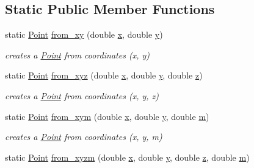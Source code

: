 \subsection*{Static Public Member Functions}
\begin{DoxyCompactItemize}
\item 
static \hyperlink{classsimo_1_1shapes_1_1_point}{Point} \hyperlink{classsimo_1_1shapes_1_1_point_a5babfdb4e450381fce0bd355c060d3cf}{from\-\_\-xy} (double \hyperlink{classsimo_1_1shapes_1_1_point_aa4abc96b03859b69bb1af19099a9799f}{x}, double \hyperlink{classsimo_1_1shapes_1_1_point_a370ca8d7d03517735a9792cca7cbb05e}{y})
\begin{DoxyCompactList}\small\item\em creates a \hyperlink{classsimo_1_1shapes_1_1_point}{Point} from coordinates (x, y) \end{DoxyCompactList}\item 
static \hyperlink{classsimo_1_1shapes_1_1_point}{Point} \hyperlink{classsimo_1_1shapes_1_1_point_af2fe59e7e25d3ab1019fbf9a3365fa30}{from\-\_\-xyz} (double \hyperlink{classsimo_1_1shapes_1_1_point_aa4abc96b03859b69bb1af19099a9799f}{x}, double \hyperlink{classsimo_1_1shapes_1_1_point_a370ca8d7d03517735a9792cca7cbb05e}{y}, double \hyperlink{classsimo_1_1shapes_1_1_point_a4498c1e84bb25e32cd75d41a74d48169}{z})
\begin{DoxyCompactList}\small\item\em creates a \hyperlink{classsimo_1_1shapes_1_1_point}{Point} from coordinates (x, y, z) \end{DoxyCompactList}\item 
static \hyperlink{classsimo_1_1shapes_1_1_point}{Point} \hyperlink{classsimo_1_1shapes_1_1_point_a73475fb5d47c0c77506d8c83c0287f57}{from\-\_\-xym} (double \hyperlink{classsimo_1_1shapes_1_1_point_aa4abc96b03859b69bb1af19099a9799f}{x}, double \hyperlink{classsimo_1_1shapes_1_1_point_a370ca8d7d03517735a9792cca7cbb05e}{y}, double \hyperlink{classsimo_1_1shapes_1_1_point_aced73731924b13762c7b6446bf3ad9a5}{m})
\begin{DoxyCompactList}\small\item\em creates a \hyperlink{classsimo_1_1shapes_1_1_point}{Point} from coordinates (x, y, m) \end{DoxyCompactList}\item 
static \hyperlink{classsimo_1_1shapes_1_1_point}{Point} \hyperlink{classsimo_1_1shapes_1_1_point_a04c56d21b56fa034bb9b83150bb89a10}{from\-\_\-xyzm} (double \hyperlink{classsimo_1_1shapes_1_1_point_aa4abc96b03859b69bb1af19099a9799f}{x}, double \hyperlink{classsimo_1_1shapes_1_1_point_a370ca8d7d03517735a9792cca7cbb05e}{y}, double \hyperlink{classsimo_1_1shapes_1_1_point_a4498c1e84bb25e32cd75d41a74d48169}{z}, double \hyperlink{classsimo_1_1shapes_1_1_point_aced73731924b13762c7b6446bf3ad9a5}{m})

\end{DoxyCompactItemize}
